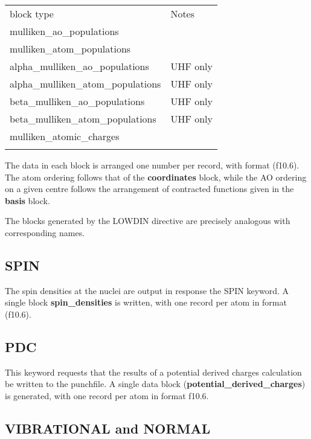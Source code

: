 \documentclass[11pt,fleqn]{article}
\begin{document}
 \begin{centering}
 \begin{tabular}{ll}
\\ \hline\hline
 block type      &     Notes\\ \cline{1-2}
mulliken\_ao\_populations           & \\
mulliken\_atom\_populations        & \\
alpha\_mulliken\_ao\_populations    & UHF only \\
alpha\_mulliken\_atom\_populations  & UHF only \\
beta\_mulliken\_ao\_populations     & UHF only \\
beta\_mulliken\_atom\_populations   & UHF only \\
mulliken\_atomic\_charges         & \\
\hline\hline
\\
 \end{tabular}

 \end{centering}


The data in each block is arranged one number per record, with
format (f10.6). The atom ordering follows that of the {\bf coordinates} block,
while the AO ordering on a given centre follows the arrangement of 
contracted functions given in the {\bf basis} block.

The blocks generated by the LOWDIN directive are precisely analogous with
corresponding names.

\subsection[SPIN]{SPIN}

The spin densities at the nuclei are output in response the SPIN keyword.
A single block {\bf spin\_densities} is written, with one record per atom in 
format (f10.6).

\subsection[PDC]{PDC}
This keyword requests that the results of a potential derived charges
calculation be written to the punchfile. A single data block
({\bf potential\_derived\_charges}) is generated, with one record per atom in 
format f10.6.

\subsection[VIBRATIONAL and NORMAL]{VIBRATIONAL and NORMAL}
\end{document}
